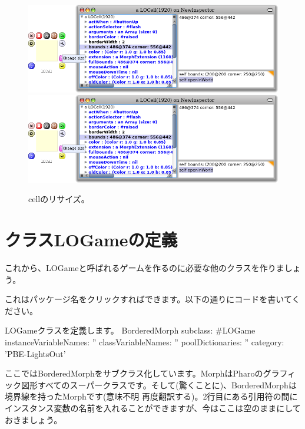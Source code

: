 \documentclass[a4paper,10pt,twoside]{book}
\begin{document}
\begin{figure}[htbp]
\centering
\ifluluelse
	{\includegraphics[width=\textwidth]{LOCellResize} }
	{\includegraphics[scale=0.7]{LOCellResize} }
\caption{cellのリサイズ。}
\end{figure}


\section{クラスLOGameの定義}

これから、LOGameと呼ばれるゲームを作るのに必要な他のクラスを作りましょう。

これはパッケージ名をクリックすればできます。以下の通りにコードを書いてください。

\begin{classdef}[sbegame]{LOGameクラスを定義します。}
BorderedMorph subclass: #LOGame
   instanceVariableNames: ''
   classVariableNames: ''
   poolDictionaries: ''
   category: 'PBE-LightsOut'
\end{classdef}

ここではBorderedMorphをサブクラス化しています。MorphはPharoのグラフィック図形すべてのスーパークラスです。そして(驚くことに)、BorderedMorphは境界線を持ったMorphです(意味不明 再度翻訳する)。2行目にある引用符の間にインスタンス変数の名前を入れることができますが、今はここは空のままにしておきましょう。
\end{document}
